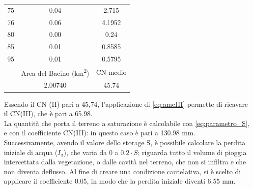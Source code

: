 \begin{table}[H]
\begin{tabular}{ccc}
    75                 & 0.04                           & 2.715             \\
    76                 & 0.06                           & 4.1952            \\
    80                 & 0.00                           & 0.24              \\
    85                 & 0.01                           & 0.8585            \\
    95                 & 0.01                           & 0.5795            \\
    \midrule
          & Area del Bacino (\unit{km^2}) & CN medio\\
   & 2.00740               & 45.74   \\
   \bottomrule
    \end{tabular}
    \end{table}

Essendo il CN (II) pari a 45,74, l'applicazione di \eqref{eq:amcIII} permette di ricavare il CN(III), che è pari a 65.98.\\
La quantità che porta il terreno a saturazione è calcolabile con \eqref{eq:parametro_S}, e con il coefficiente CN(III): in questo caso è pari a 130.98 mm.\\
Successivamente, avendo il valore dello storage S, è possibile calcolare la perdita iniziale di acqua ($I_a$), che varia da 0 a $0.2\cdot S$; riguarda tutto il volume di pioggia intercettata dalla vegetazione, o dalle cavità nel terreno, che non si infiltra e che non diventa deflusso. Al fine di creare una condizione cautelativa, si è scelto di applicare il coefficiente 0.05, in modo che la perdita iniziale diventi 6.55 mm.

